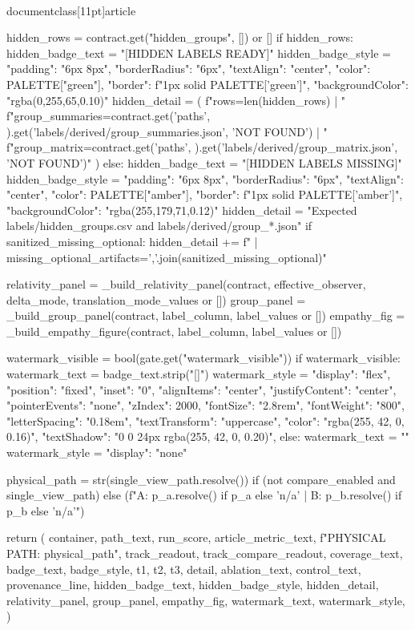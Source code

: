 \\documentclass[11pt]{article}
\begin{document}
\begin{CodeBlock}
{{{{{{{{    hidden_rows = contract.get("hidden_groups", []) or []
    if hidden_rows:
        hidden_badge_text = "[HIDDEN LABELS READY]"
        hidden_badge_style = {"padding": "6px 8px", "borderRadius": "6px", "textAlign": "center", "color": PALETTE["green"], "border": f"1px solid {PALETTE['green']}", "backgroundColor": "rgba(0,255,65,0.10)"}
        hidden_detail = (
            f"rows={len(hidden_rows)} | "
            f"group_summaries={contract.get('paths', {}).get('labels/derived/group_summaries.json', 'NOT FOUND')} | "
            f"group_matrix={contract.get('paths', {}).get('labels/derived/group_matrix.json', 'NOT FOUND')}"
        )
    else:
        hidden_badge_text = "[HIDDEN LABELS MISSING]"
        hidden_badge_style = {"padding": "6px 8px", "borderRadius": "6px", "textAlign": "center", "color": PALETTE["amber"], "border": f"1px solid {PALETTE['amber']}", "backgroundColor": "rgba(255,179,71,0.12)"}
        hidden_detail = "Expected labels/hidden_groups.csv and labels/derived/group_*.json"
        if sanitized_missing_optional:
            hidden_detail += f" | missing_optional_artifacts={','.join(sanitized_missing_optional)}"

    relativity_panel = _build_relativity_panel(contract, effective_observer, delta_mode, translation_mode_values or [])
    group_panel = _build_group_panel(contract, label_column, label_values or [])
    empathy_fig = _build_empathy_figure(contract, label_column, label_values or [])

    watermark_visible = bool(gate.get("watermark_visible"))
    if watermark_visible:
        watermark_text = badge_text.strip("[]")
        watermark_style = {
            "display": "flex",
            "position": "fixed",
            "inset": "0",
            "alignItems": "center",
            "justifyContent": "center",
            "pointerEvents": "none",
            "zIndex": 2000,
            "fontSize": "2.8rem",
            "fontWeight": "800",
            "letterSpacing": "0.18em",
            "textTransform": "uppercase",
            "color": "rgba(255, 42, 0, 0.16)",
            "textShadow": "0 0 24px rgba(255, 42, 0, 0.20)",
        }
    else:
        watermark_text = ""
        watermark_style = {"display": "none"}

    physical_path = str(single_view_path.resolve()) if (not compare_enabled and single_view_path) else (f"A: {p_a.resolve() if p_a else 'n/a'} | B: {p_b.resolve() if p_b else 'n/a'}")

    return (
        container,
        path_text,
        run_score,
        article_metric_text,
        f"PHYSICAL PATH: {physical_path}",
        track_readout,
        track_compare_readout,
        coverage_text,
        badge_text,
        badge_style,
        t1,
        t2,
        t3,
        detail,
        ablation_text,
        control_text,
        provenance_line,
        hidden_badge_text,
        hidden_badge_style,
        hidden_detail,
        relativity_panel,
        group_panel,
        empathy_fig,
        watermark_text,
        watermark_style,
    )


}}}}}}}}
\end{CodeBlock}
\end{document}

